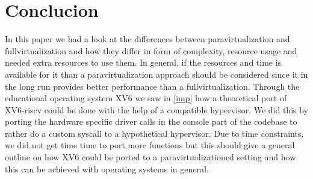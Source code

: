 

\section{Conclucion}
\label{conclucion}

In this paper we had a look at the differences between paravirtualization and fullvirtualization and how they differ in form of complexity, resource usage and needed extra resources to use them. In general, if the resources and time is available for it than a paravirtualization approach should be considered since it in the long run provides better performance than a fullvirtualization. Through the educational operating system XV6 we saw in \ref{imp} how a theoretical port of XV6-riscv could be done with the help of a compatible hypervisor. We did this by porting the hardware specific driver calls in the console part of the codebase to rather do a custom syscall to a hypothetical hypervisor. Due to time constraints, we did not get time time to port more functions but this should give a general outline on how XV6 could be ported to a paravirtualizationed setting and how this can be achieved with operating systems in general.